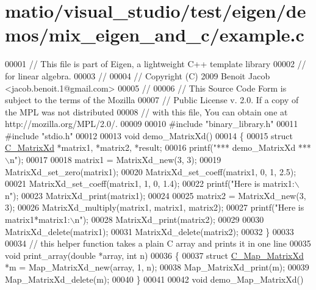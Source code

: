\hypertarget{matio_2visual__studio_2test_2eigen_2demos_2mix__eigen__and__c_2example_8c_source}{}\section{matio/visual\+\_\+studio/test/eigen/demos/mix\+\_\+eigen\+\_\+and\+\_\+c/example.c}
\label{matio_2visual__studio_2test_2eigen_2demos_2mix__eigen__and__c_2example_8c_source}

\begin{DoxyCode}
00001 \textcolor{comment}{// This file is part of Eigen, a lightweight C++ template library}
00002 \textcolor{comment}{// for linear algebra.}
00003 \textcolor{comment}{//}
00004 \textcolor{comment}{// Copyright (C) 2009 Benoit Jacob <jacob.benoit.1@gmail.com>}
00005 \textcolor{comment}{//}
00006 \textcolor{comment}{// This Source Code Form is subject to the terms of the Mozilla}
00007 \textcolor{comment}{// Public License v. 2.0. If a copy of the MPL was not distributed}
00008 \textcolor{comment}{// with this file, You can obtain one at http://mozilla.org/MPL/2.0/.}
00009 
00010 \textcolor{preprocessor}{#include "binary\_library.h"}
00011 \textcolor{preprocessor}{#include "stdio.h"}
00012 
00013 \textcolor{keywordtype}{void} demo\_MatrixXd()
00014 \{
00015   \textcolor{keyword}{struct }\hyperlink{struct_c___matrix_xd}{C\_MatrixXd} *matrix1, *matrix2, *result;
00016   printf(\textcolor{stringliteral}{"*** demo\_MatrixXd ***\(\backslash\)n"});
00017   
00018   matrix1 = MatrixXd\_new(3, 3);
00019   MatrixXd\_set\_zero(matrix1);
00020   MatrixXd\_set\_coeff(matrix1, 0, 1, 2.5);
00021   MatrixXd\_set\_coeff(matrix1, 1, 0, 1.4);
00022   printf(\textcolor{stringliteral}{"Here is matrix1:\(\backslash\)n"});
00023   MatrixXd\_print(matrix1);
00024 
00025   matrix2 = MatrixXd\_new(3, 3);
00026   MatrixXd\_multiply(matrix1, matrix1, matrix2);
00027   printf(\textcolor{stringliteral}{"Here is matrix1*matrix1:\(\backslash\)n"});
00028   MatrixXd\_print(matrix2);
00029 
00030   MatrixXd\_delete(matrix1);
00031   MatrixXd\_delete(matrix2);
00032 \}
00033 
00034 \textcolor{comment}{// this helper function takes a plain C array and prints it in one line}
00035 \textcolor{keywordtype}{void} print\_array(\textcolor{keywordtype}{double} *array, \textcolor{keywordtype}{int} n)
00036 \{
00037   \textcolor{keyword}{struct }\hyperlink{struct_c___map___matrix_xd}{C\_Map\_MatrixXd} *m = Map\_MatrixXd\_new(array, 1, n);
00038   Map\_MatrixXd\_print(m);
00039   Map\_MatrixXd\_delete(m);
00040 \}
00041 
00042 \textcolor{keywordtype}{void} demo\_Map\_MatrixXd()

\end{DoxyCode}
